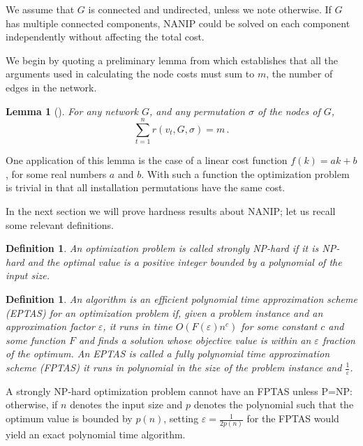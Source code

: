 \documentclass[english]{llncs}
\newtheorem{defn}[thm]{Definition}
\newtheorem{lem}[thm]{Lemma}
\begin{document}
We assume that $G$ is connected and undirected, unless we note otherwise. If
$G$ has multiple connected components, NANIP could be solved on each component
independently without affecting the total cost.

We begin by quoting a preliminary lemma from \cite{Gutfraind14} which
establishes that all the arguments used in calculating the node costs must sum
to $m$, the number of edges in the network.

\begin{lem}[\cite{Gutfraind14}]
\label{lem:edge-decomp}
For any network $G$, and any permutation $\sigma$ of the nodes of $G$, 
\begin{equation}
\sum_{t=1}^n r(v_t,G,\sigma) = m \label{eq:edge-decomp}\,.
\end{equation}
\end{lem}

One application of this lemma is the case of a linear cost function
$f(k)=ak+b$, for some real numbers $a$ and $b$.  With such a function the
optimization problem is trivial in that all installation permutations have the
same cost.

In the next section we will prove hardness results about NANIP; let us recall
some relevant definitions.

\begin{defn}

An optimization problem is called \emph{strongly NP-hard} if it is NP-hard and
the optimal value is a positive integer bounded by a polynomial of the input
size.

\end{defn}


\begin{defn}

An algorithm is an \emph{efficient polynomial time approximation scheme
(EPTAS)} for an optimization problem if, given a problem instance and an
approximation factor $\varepsilon$, it runs in time $O(F(\varepsilon) n^c)$
for some constant $c$ and some function $F$ and finds a solution whose
objective value is within an $\varepsilon$ fraction of the optimum. An EPTAS is
called a \emph{fully polynomial time approximation scheme (FPTAS)} it runs in
polynomial in the size of the problem instance and $\frac{1}{\varepsilon}$.  

\end{defn}

A strongly NP-hard optimization problem cannot have an FPTAS unless
P=NP: otherwise, if $n$ denotes the input size and $p$ denotes the polynomial
such that the optimum value is bounded by $p(n)$, setting
$\varepsilon=\frac{1}{2p(n)}$ for the FPTAS would yield an exact polynomial
time algorithm.
\end{document}
